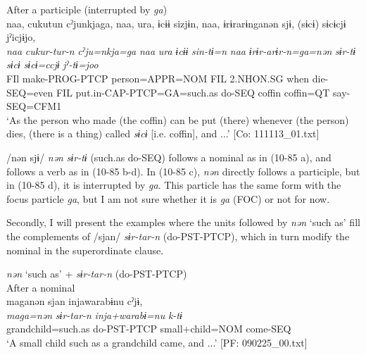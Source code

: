 \begin{xlist}
  \ex After a participle (interrupted by \textit{ga})\\
      \glll    naa,  cukutun  cˀjunkjaga,  naa,  ura,  ɨcɨɨ  sizjɨn,  naa,  ɨrɨrarɨnganən  sjɨ,  (sɨcɨ)  sɨcɨcjɨ  jˀicjɨjo,\\                                                                                                                                                                                                      
    \textit{naa}  \textit{cukur-tur-n}  \textit{cˀju=nkja=ga}  \textit{naa}  \textit{ura}  \textit{ɨcɨɨ} \textit{sin-tɨ=n}  \textit{naa}  \textit{ɨrɨr-arɨr-n=ga=nən}  \textit{sɨr-tɨ}  \textit{sɨcɨ} \textit{sɨcɨ=ccjɨ}  \textit{jˀ-tɨ=joo}\\                                                                                                                                                                                                      
    FIl  make-PROG-PTCP  person=APPR=NOM  FIL  2.NHON.SG  when   die-SEQ=even  FIL  put.in-CAP-PTCP=GA=such.as  do-SEQ  coffin  coffin=QT  say-SEQ=CFM1\\
    \glt ‘As the person who made (the coffin) can be put (there) whenever (the person) dies, (there is a thing) called \textit{sɨcɨ} [i.e. coffin], and ...’ [Co: 111113\_01.txt]
    \z
\z

/nən sjɨ/ \textit{nən} \textit{sɨr-tɨ} (such.as do-SEQ) follows a nominal as in (10-85 a), and follows a verb as in (10-85 b-d). In (10-85 c), \textit{nən} directly follows a participle, but in (10-85 d), it is interrupted by \textit{ga}. This particle has the same form with the focus particle \textit{ga}, but I am not sure whether it is \textit{ga} (FOC) or not for now.

  Secondly, I will present the examples where the units followed by \textit{nən} ‘such as’ fill the complements of /sjan/ \textit{sɨr-tar-n} (do-PST-PTCP), which in turn modify the nominal in the superordinate clause.

\ea\label{ex:10.86}   \textit{nən} ‘such as’ + \textit{sɨr-tar-n} (do-PST-PTCP)\\
  \ea After a nominal\\
      \glll    maganən  sjan  injawarabɨnu  cˀjɨ,\\
    \textit{maga=nən}  \textit{sɨr-tar-n}  \textit{inja+warabɨ=nu}  \textit{k-tɨ}\\
    grandchild=such.as  do-PST-PTCP  small+child=NOM  come-SEQ\\
    \glt     ‘A small child such as a grandchild came, and ...’ [PF: 090225\_00.txt]


\end{xlist}
